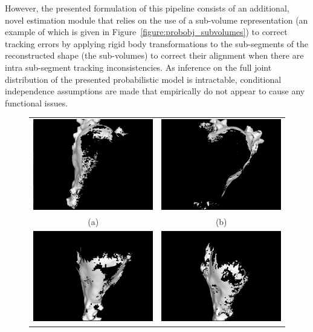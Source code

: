 However, the presented formulation of this pipeline consists of an
additional, novel estimation module that relies on the use of a sub-volume
representation (an example of which is given in Figure~\ref{figure:probobj_subvolumes}) 
to correct tracking errors by applying rigid body transformations to the sub-segments of 
the reconstructed shape (the sub-volumes) to correct their alignment when there are intra 
sub-segment tracking inconsistencies. As inference on the full joint distribution of the 
presented probabilistic model is intractable, conditional independence assumptions are made 
that empirically do not appear to cause any functional issues. 

\begin{figure}[!htbp]
  \centering
  \begin{tabular}{cc}
    \includegraphics[width=.4\linewidth]{figures/object_recon/subvolumes/0.png} &
    \includegraphics[width=.4\linewidth]{figures/object_recon/subvolumes/1.png} \\
    (a) & (b) \\
    \includegraphics[width=.4\linewidth]{figures/object_recon/subvolumes/2.png} &
    \includegraphics[width=.4\linewidth]{figures/object_recon/subvolumes/3.png} \\

\end{tabular}
\end{figure}
